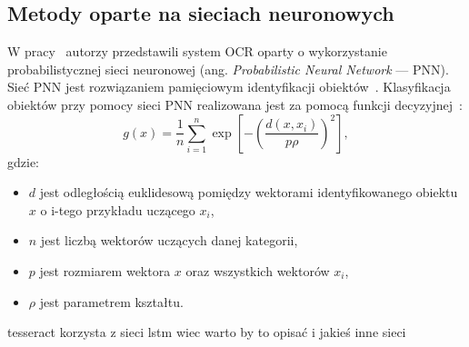 \subsection{Metody oparte na sieciach neuronowych}
W pracy~\cite{1688109} autorzy przedstawili system OCR oparty o wykorzystanie probabilistycznej sieci neuronowej (ang. \textit{Probabilistic Neural Network } --- PNN).
Sieć PNN jest rozwiązaniem pamięciowym identyfikacji obiektów~\cite{Praczyk_2011}.
Klasyfikacja obiektów przy pomocy sieci PNN realizowana jest za pomocą funkcji decyzyjnej~\cite{SPECHT1990109}:
\begin{equation}
    \label{eq:pnn_network}
    g(x)=\dfrac{1}{n}\sum_{i=1}^{n}\exp\left[ -\left( \dfrac{d(x,x_i)}{p\rho} \right)^2 \right],
\end{equation}
gdzie:
\begin{itemize}
    \item $d$ jest odległością euklidesową pomiędzy wektorami identyfikowanego obiektu $x$ o i-tego przykładu uczącego $x_i$,
    \item $n$ jest liczbą wektorów uczących danej kategorii,
    \item $p$ jest rozmiarem wektora $x$ oraz wszystkich wektorów $x_i$,
    \item $\rho$ jest parametrem kształtu.
\end{itemize}

tesseract korzysta z sieci lstm wiec warto by to opisać i jakieś inne sieci

